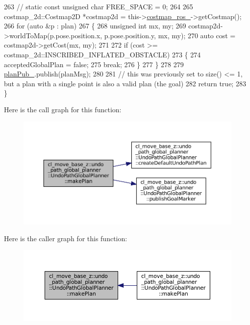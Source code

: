 \begin{DoxyCode}
263             \textcolor{comment}{// static const unsigned char FREE\_SPACE = 0;}
264 
265             costmap\_2d::Costmap2D *costmap2d = this->\hyperlink{classcl__move__base__z_1_1undo__path__global__planner_1_1UndoPathGlobalPlanner_ab63eeb465e3ae989a6edcc4d059cf8f0}{costmap\_ros\_}->getCostmap();
266             \textcolor{keywordflow}{for} (\textcolor{keyword}{auto} &p : plan)
267             \{
268                 \textcolor{keywordtype}{unsigned} \textcolor{keywordtype}{int} mx, my;
269                 costmap2d->worldToMap(p.pose.position.x, p.pose.position.y, mx, my);
270                 \textcolor{keyword}{auto} cost = costmap2d->getCost(mx, my);
271 
272                 \textcolor{keywordflow}{if} (cost >= costmap\_2d::INSCRIBED\_INFLATED\_OBSTACLE)
273                 \{
274                     acceptedGlobalPlan = \textcolor{keyword}{false};
275                     \textcolor{keywordflow}{break};
276                 \}
277             \}
278 
279             \hyperlink{classcl__move__base__z_1_1undo__path__global__planner_1_1UndoPathGlobalPlanner_a65bf364a122d5950baf1bf8b42309d68}{planPub\_}.publish(planMsg);
280 
281             \textcolor{comment}{// this was previously set to size() <= 1, but a plan with a single point is also a valid plan
       (the goal)}
282             \textcolor{keywordflow}{return} \textcolor{keyword}{true};
283         \}
\end{DoxyCode}
Here is the call graph for this function\+:
\nopagebreak
\begin{figure}[H]
\begin{center}
\leavevmode
\includegraphics[width=350pt]{classcl__move__base__z_1_1undo__path__global__planner_1_1UndoPathGlobalPlanner_a46034d27c0811abae440009457a7f8b0_cgraph}
\end{center}
\end{figure}
Here is the caller graph for this function\+:
\nopagebreak
\begin{figure}[H]
\begin{center}
\leavevmode
\includegraphics[width=350pt]{classcl__move__base__z_1_1undo__path__global__planner_1_1UndoPathGlobalPlanner_a46034d27c0811abae440009457a7f8b0_icgraph}
\end{center}
\end{figure}

